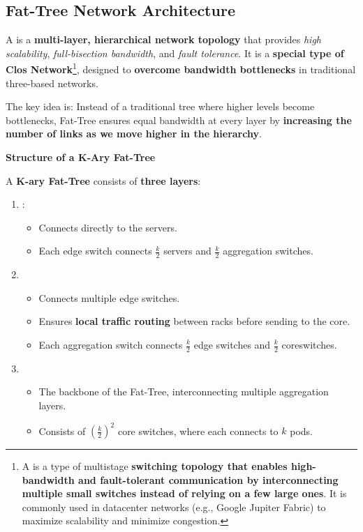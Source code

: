 \subsection{Fat-Tree Network Architecture}

A  is a \textbf{multi-layer, hierarchical network topology} that provides \emph{high scalability}, \emph{full-bisection bandwidth}, and \emph{fault tolerance}. It is a \textbf{special type of Clos Network}\footnote{%
    A  is a type of multistage \textbf{switching topology that enables high-bandwidth and fault-tolerant communication by interconnecting multiple small switches instead of relying on a few large ones}. It is commonly used in datacenter networks (e.g., Google Jupiter Fabric) to maximize scalability and minimize congestion.
}, designed to \textbf{overcome bandwidth bottlenecks} in traditional three-based networks.

\highspace
The key idea is: Instead of a traditional tree where higher levels become bottlenecks, Fat-Tree ensures equal bandwidth at every layer by \textbf{increasing the number of links as we move higher in the hierarchy}.

\highspace
\begin{flushleft}
    \textcolor{Green3}{ \textbf{Structure of a K-Ary Fat-Tree}}
\end{flushleft}
A \textbf{K-ary Fat-Tree} consists of \textbf{three layers}:
\begin{enumerate}
    \item {}:
    \begin{itemize}
        \item Connects directly to the servers.
        \item Each edge switch connects $\frac{k}{2}$ servers and $\frac{k}{2}$ aggregation switches.
    \end{itemize}

    \item {}
    \begin{itemize}
        \item Connects multiple edge switches.
        \item Ensures \textbf{local traffic routing} between racks before sending to the core.
        \item Each aggregation switch connects $\frac{k}{2}$ edge switches and $\frac{k}{2}$ core\break switches.
    \end{itemize}

    \item {}
    \begin{itemize}
        \item The backbone of the Fat-Tree, interconnecting multiple aggregation layers.
        \item Consists of $\left(\frac{k}{2}\right)^{2}$ core switches, where each connects to $k$ pods.
    \end{itemize}
\end{enumerate}  

